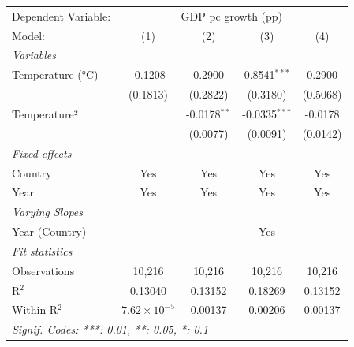 
\begingroup
\centering
\begin{tabular}{lcccc}
   \tabularnewline \midrule \midrule
   Dependent Variable: & \multicolumn{4}{c}{GDP pc growth (pp)}\\
   Model:           & (1)                   & (2)            & (3)             & (4)\\  
   \midrule
   \emph{Variables}\\
   Temperature (°C) & -0.1208               & 0.2900         & 0.8541$^{***}$  & 0.2900\\   
                    & (0.1813)              & (0.2822)       & (0.3180)        & (0.5068)\\   
   Temperature²     &                       & -0.0178$^{**}$ & -0.0335$^{***}$ & -0.0178\\   
                    &                       & (0.0077)       & (0.0091)        & (0.0142)\\   
   \midrule
   \emph{Fixed-effects}\\
   Country          & Yes                   & Yes            & Yes             & Yes\\  
   Year             & Yes                   & Yes            & Yes             & Yes\\  
   \midrule
   \emph{Varying Slopes}\\
   Year (Country)   &                       &                & Yes             & \\  
   \midrule
   \emph{Fit statistics}\\
   Observations     & 10,216                & 10,216         & 10,216          & 10,216\\  
   R$^2$            & 0.13040               & 0.13152        & 0.18269         & 0.13152\\  
   Within R$^2$     & $7.62\times 10^{-5}$  & 0.00137        & 0.00206         & 0.00137\\  
   \midrule \midrule
   \multicolumn{5}{l}{\emph{Signif. Codes: ***: 0.01, **: 0.05, *: 0.1}}\\
\end{tabular}
\par\endgroup


